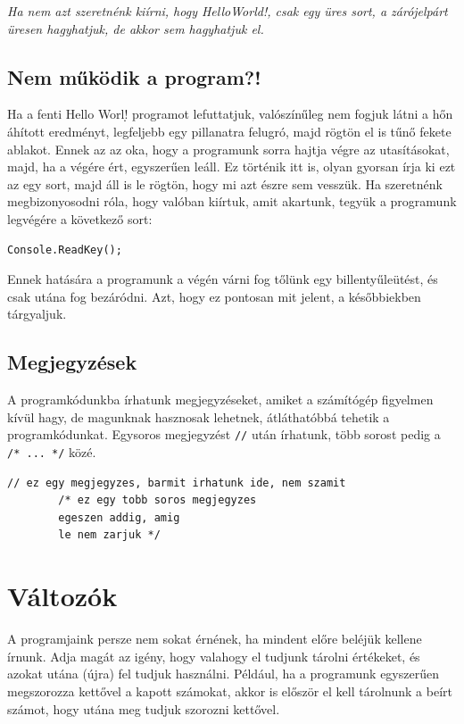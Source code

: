 \documentclass[a4paper]{article}
\begin{document}
	\emph{Ha nem azt szeretnénk kiírni, hogy HelloWorld!, csak egy üres sort, a zárójelpárt üresen hagyhatjuk, de akkor sem hagyhatjuk el.}
	
	\subsection{Nem működik a program?!}
	Ha a fenti Hello Worl\d! programot lefuttatjuk, valószínűleg nem fogjuk látni a hőn áhított eredményt, legfeljebb egy pillanatra felugró, majd rögtön el is tűnő fekete ablakot. Ennek az az oka, hogy a programunk sorra hajtja végre az utasításokat, majd, ha a végére ért, egyszerűen leáll. Ez történik itt is, olyan gyorsan írja ki ezt az egy sort, majd áll is le rögtön, hogy mi azt észre sem vesszük. Ha szeretnénk megbizonyosodni róla, hogy valóban kiírtuk, amit akartunk, tegyük a programunk legvégére a következő sort:
	
	\begin{lstlisting}[caption=Várakozás billentyűleütésre, label=lst:readkey]
		Console.ReadKey();
	\end{lstlisting}
	
	Ennek hatására a programunk a végén várni fog tőlünk egy billentyűleütést, és csak utána fog bezáródni. Azt, hogy ez pontosan mit jelent, a későbbiekben tárgyaljuk.
	
	\subsection{Megjegyzések}
	A programkódunkba írhatunk megjegyzéseket, amiket a számítógép figyelmen kívül hagy, de magunknak hasznosak lehetnek, átláthatóbbá tehetik a programkódunkat. Egysoros megjegyzést \lstinline{//} után írhatunk, több sorost pedig a \lstinline{/* ... */} közé.
	
	\begin{lstlisting}[caption=Megjegyzések, label=lst:comments]
		// ez egy megjegyzes, barmit irhatunk ide, nem szamit
		/* ez egy tobb soros megjegyzes
		egeszen addig, amig
		le nem zarjuk */
	\end{lstlisting}
	
	\section{Változók}
	A programjaink persze nem sokat érnének, ha mindent előre beléjük kellene írnunk. Adja magát az igény, hogy valahogy el tudjunk tárolni értékeket, és azokat utána (újra) fel tudjuk használni. Például, ha a programunk egyszerűen megszorozza kettővel a kapott számokat, akkor is először el kell tárolnunk a beírt számot, hogy utána meg tudjuk szorozni kettővel.
	
\end{document}

